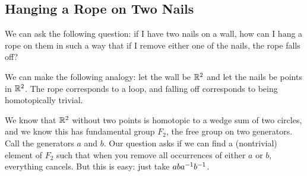 \subsection{Hanging a Rope on Two Nails}

We can ask the following question: if I have two nails on a wall, how can I hang a rope on them in such a way that if I remove either one of the nails, the rope falls off?

We can make the following analogy: let the wall be $\mathbb{R}^2$ and let the nails be points in $\mathbb{R}^2$. The rope corresponds to a loop, and falling off corresponds to being homotopically trivial.

We know that $\mathbb{R}^2$ without two points is homotopic to a wedge sum of two circles, and we know this has fundamental group $F_2$, the free group on two generators. Call the generators $a$ and $b$. Our question asks if we can find a (nontrivial) element of $F_2$ such that when you remove all occurrences of either $a$ or $b$, everything cancels. But this is easy: just take $aba^{-1} b^{-1}$.
